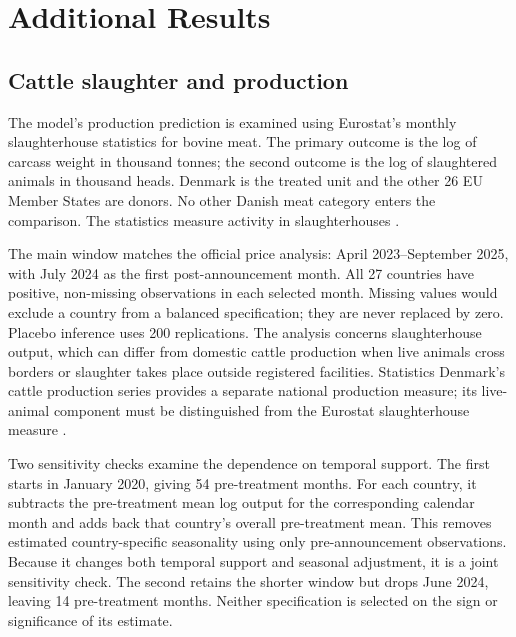 \documentclass[11pt]{article}
\begin{document}
\clearpage
\renewcommand{\thetable}{B\arabic{table}}
\renewcommand{\thefigure}{B\arabic{figure}}
\renewcommand{\theequation}{B\arabic{equation}}
\setcounter{table}{0}
\setcounter{figure}{0}
\setcounter{equation}{0}
\section{Additional Results}

\subsection{Cattle slaughter and production}\label{app:production}
The model's production prediction is examined using Eurostat's monthly slaughterhouse statistics for bovine meat. The primary outcome is the log of carcass weight in thousand tonnes; the second outcome is the log of slaughtered animals in thousand heads. Denmark is the treated unit and the other 26 EU Member States are donors. No other Danish meat category enters the comparison. The statistics measure activity in slaughterhouses \citep{eurostatslaughter2026}.

The main window matches the official price analysis: April 2023--September 2025, with July 2024 as the first post-announcement month. All 27 countries have positive, non-missing observations in each selected month. Missing values would exclude a country from a balanced specification; they are never replaced by zero. Placebo inference uses 200 replications. The analysis concerns slaughterhouse output, which can differ from domestic cattle production when live animals cross borders or slaughter takes place outside registered facilities. Statistics Denmark's cattle production series provides a separate national production measure; its live-animal component must be distinguished from the Eurostat slaughterhouse measure \citep{dstproduction2026}.

Two sensitivity checks examine the dependence on temporal support. The first starts in January 2020, giving 54 pre-treatment months. For each country, it subtracts the pre-treatment mean log output for the corresponding calendar month and adds back that country's overall pre-treatment mean. This removes estimated country-specific seasonality using only pre-announcement observations. Because it changes both temporal support and seasonal adjustment, it is a joint sensitivity check. The second retains the shorter window but drops June 2024, leaving 14 pre-treatment months. Neither specification is selected on the sign or significance of its estimate.
\end{document}
